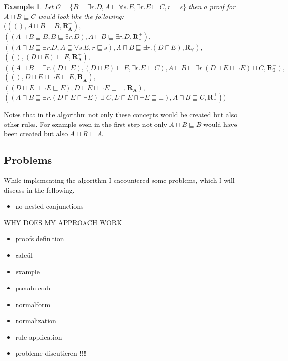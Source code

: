 \documentclass[titlepage]{article}
\newtheorem{example}{Example}
\begin{document}
\begin{example}
  Let $\mathcal{O} = \{ B \sqsubseteq \exists r.D, A \sqsubseteq \forall s.E, \exists r.E \sqsubseteq C, r \sqsubseteq s\}$
  then a proof for $A \sqcap B \sqsubseteq C $ would look like the following: \\
    $(((),A \sqcap B \sqsubseteq B, \mathbf{R^+_A}),$ \\
    $((A \sqcap B \sqsubseteq B, B \sqsubseteq \exists r.D), A \sqcap B \sqsubseteq \exists r.D, \mathbf{R^+_{\exists}}), $ \\
    $((A \sqcap B \sqsubseteq \exists r.D, A \sqsubseteq \forall s.E, r \sqsubseteq s),A \sqcap B \sqsubseteq \exists r.(D \sqcap E), \mathbf{R_{\forall}}), $ \\
    $((),(D \sqcap E) \sqsubseteq E, \mathbf{R^+_A}),$ \\
    $((A \sqcap B \sqsubseteq \exists r.(D \sqcap E), (D \sqcap E) \sqsubseteq E, \exists r.E \sqsubseteq C), A \sqcap B \sqsubseteq \exists r.(D \sqcap E \sqcap \neg E) \sqcup C, \mathbf{R^-_{\exists}}),$ \\
    $((), D \sqcap E \sqcap \neg E \sqsubseteq E, \mathbf{R^+_A}), $ \\
    $((D \sqcap E \sqcap \neg E \sqsubseteq E),D \sqcap E \sqcap \neg E \sqsubseteq \bot, \mathbf{R^-_A}),$ \\
    $((A \sqcap B \sqsubseteq \exists r.(D \sqcap E \sqcap \neg E) \sqcup C, D \sqcap E \sqcap \neg E \sqsubseteq \bot), A \sqcap B \sqsubseteq C, \mathbf{R^{\bot}_{\exists}}))$
\end{example}
Notes that in the algorithm not only these concepts would be created but also other rules.
For example even in the first step not only $A \sqcap B \sqsubseteq B$ would have been created but also
$A \sqcap B \sqsubseteq A$.



\subsection{Problems}
While implementing the algorithm I encountered some problems, which I will discuss in the following.

\begin{itemize}
  \item no nested conjunctions
\end{itemize}

WHY DOES MY APPROACH WORK


\begin{itemize}

  \item proofs definition
  \item calcül
  \item example 
  \item pseudo code
  \item normalform
  \item normalization
  \item rule application
  \item probleme discutieren !!!!
\end{itemize}
\end{document}
